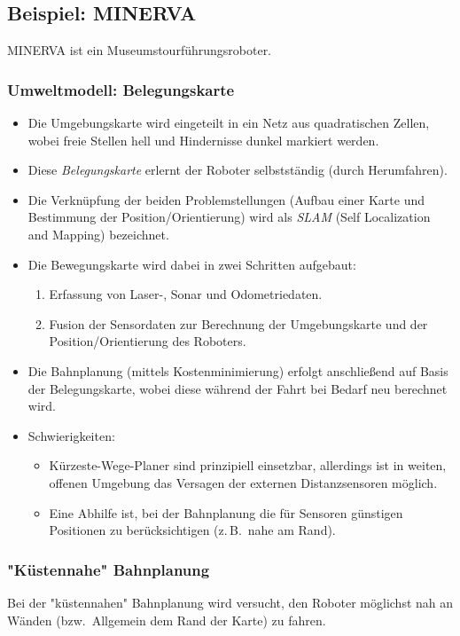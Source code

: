 \documentclass[a4paper, 11pt, accentcolor = tud3b]{tudreport}
\newcommand{\bzw}{bzw.~}
\newcommand{\zB}{z.\,B.~}
\begin{document}
			\subsection{Beispiel: MINERVA}
				MINERVA ist ein Museumstourführungsroboter.
				
				\subsubsection{Umweltmodell: Belegungskarte}
					\begin{itemize}
						\item Die Umgebungskarte wird eingeteilt in ein Netz aus quadratischen Zellen, wobei freie Stellen hell und Hindernisse dunkel markiert werden.
						\item Diese \emph{Belegungskarte} erlernt der Roboter selbstständig (durch Herumfahren).
						\item Die Verknüpfung der beiden Problemstellungen (Aufbau einer Karte und Bestimmung der Position/Orientierung) wird als \emph{SLAM} (Self Localization and Mapping) bezeichnet.
						\item Die Bewegungskarte wird dabei in zwei Schritten aufgebaut:
							\begin{enumerate}
								\item Erfassung von Laser-, Sonar und Odometriedaten.
								\item Fusion der Sensordaten zur Berechnung der Umgebungskarte und der Position/Orientierung des Roboters.
							\end{enumerate}
						\item Die Bahnplanung (mittels Kostenminimierung) erfolgt anschließend auf Basis der Belegungskarte, wobei diese während der Fahrt bei Bedarf neu berechnet wird.
						\item Schwierigkeiten:
							\begin{itemize}
								\item Kürzeste-Wege-Planer sind prinzipiell einsetzbar, allerdings ist in weiten, offenen Umgebung das Versagen der externen Distanzsensoren möglich.
								\item Eine Abhilfe ist, bei der Bahnplanung die für Sensoren günstigen Positionen zu berücksichtigen (\zB nahe am Rand).
							\end{itemize}
					\end{itemize}

				\subsubsection{"Küstennahe" Bahnplanung}
					Bei der "küstennahen" Bahnplanung wird versucht, den Roboter möglichst nah an Wänden (\bzw Allgemein dem Rand der Karte) zu fahren.
\end{document}
